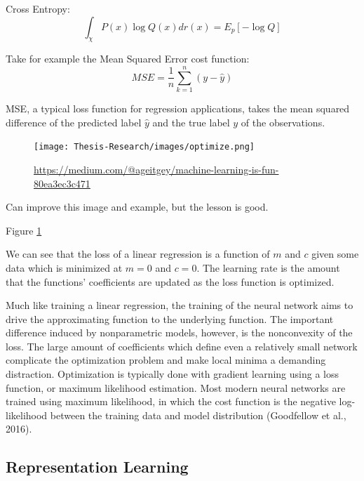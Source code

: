 \documentclass[12pt,twoside]{reedthesis}
\begin{document}
Cross Entropy: \[
\int_\chi P(x) \log Q (x) dr(x) = E_p [- \log Q]
\]

Take for example the Mean Squared Error cost function: \[
MSE = \frac{1}{n} \sum_{k=1}^n  (y - \hat y)
\]

MSE, a typical loss function for regression applications, takes the mean
squared difference of the predicted label \(\hat y\) and the true label
\(y\) of the observations.
\begin{figure}
\centering
\texttt{[image: Thesis-Research/images/optimize.png]}
\caption{\label{fig:optimize}\url{https://medium.com/@ageitgey/machine-learning-is-fun-80ea3ec3c471}}
\end{figure}
Can improve this image and example, but the lesson is good.

Figure \ref{fig:optimize}

We can see that the loss of a linear regression is a function of \(m\)
and \(c\) given some data which is minimized at \(m = 0\) and \(c = 0\).
The learning rate is the amount that the functions' coefficients are
updated as the loss function is optimized.

Much like training a linear regression, the training of the neural
network aims to drive the approximating function to the underlying
function. The important difference induced by nonparametric models,
however, is the nonconvexity of the loss. The large amount of
coefficients which define even a relatively small network complicate the
optimization problem and make local minima a demanding distraction.
Optimization is typically done with gradient learning using a loss
function, or maximum likelihood estimation. Most modern neural networks
are trained using maximum likelihood, in which the cost function is the
negative log-likelihood between the training data and model distribution
(Goodfellow et al., 2016).

\subsection{Representation Learning}\label{representation-learning}
\end{document}
